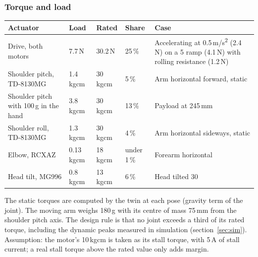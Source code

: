\documentclass[11pt,a4paper]{article}
\newcommand{\kgcm}{kg\textperiodcentered cm}
\renewcommand{\deg}{\textdegree}
\begin{document}
\subsubsection{Torque and load}
\begin{table}[H]\small
\begin{tabularx}{\linewidth}{@{}P{42mm}P{24mm}P{22mm}P{20mm}L@{}}
\toprule
\textbf{Actuator} & \textbf{Load} & \textbf{Rated} & \textbf{Share} & \textbf{Case}\\
\midrule
Drive, both motors & 7.7\,N & 30.2\,N & 25\,\% & Accelerating at 0.5\,m/s\textsuperscript{2} (2.4\,N) on a 5\deg{} ramp (4.1\,N) with rolling resistance (1.2\,N)\\
Shoulder pitch, TD-8130MG & 1.4\,\kgcm & 30\,\kgcm & 5\,\% & Arm horizontal forward, static\\
Shoulder pitch with 100\,g in the hand & 3.8\,\kgcm & 30\,\kgcm & 13\,\% & Payload at 245\,mm\\
Shoulder roll, TD-8130MG & 1.3\,\kgcm & 30\,\kgcm & 4\,\% & Arm horizontal sideways, static\\
Elbow, RCXAZ & 0.13\,\kgcm & 18\,\kgcm & under 1\,\% & Forearm horizontal\\
Head tilt, MG996 & 0.8\,\kgcm & 13\,\kgcm & 6\,\% & Head tilted 30\deg\\
\bottomrule
\end{tabularx}
\end{table}
The static torques are computed by the twin at each pose (gravity term of the joint). The moving arm weighs 180\,g with its centre of mass 75\,mm from the shoulder pitch axis. The design rule is that no joint exceeds a third of its rated torque, including the dynamic peaks measured in simulation (section~\ref{sec:sim}). Assumption: the motor's 10\,\kgcm{} is taken as its stall torque, with 5\,A of stall current; a real stall torque above the rated value only adds margin.
\end{document}

